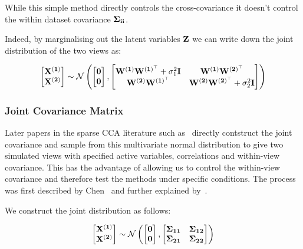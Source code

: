 While this simple method directly controls the cross-covariance it doesn't control the within dataset covariance $\bold{\Sigma_{ii}}$.

Indeed, by marginalising out the latent variables $\bold{Z}$ we can write down the joint distribution of the two views as:

\begin{align}
    \begin{bmatrix} \bold{X^{(1)}} \\ \bold{X^{(2)}} \end{bmatrix} \sim \mathcal{N} \left( \begin{bmatrix} \bold{0} \\ \bold{0} \end{bmatrix}, \begin{bmatrix} \bold{W^{(1)}W^{(1)^{\top}}} + \sigma_1^2\bold{I} & \bold{W^{(1)}W^{(2)^{\top}}} \\ \bold{W^{(2)}W^{(1)^{\top}}} & \bold{W^{(2)}W^{(2)^{\top}}} + \sigma_2^2\bold{I} \end{bmatrix} \right)
\end{align}

\subsubsection{Joint Covariance Matrix}
Later papers in the sparse CCA literature such as~\cite{mai2019iterative,chen2013sparse} directly contstruct the joint covariance and sample from this multivariate normal distribution to give two simulated views with specified active variables, correlations and within-view covariance.
This has the advantage of allowing us to control the within-view covariance and therefore test the methods under specific conditions.
The process was first described by Chen~\cite{chen2013sparse} and further explained by~\cite{suo2017sparse}.

We construct the joint distribution as follows:

\begin{align}\label{eq:covariance}
    \begin{bmatrix} \bold{X^{(1)}} \\ \bold{X^{(2)}} \end{bmatrix} \sim \mathcal{N} \left( \begin{bmatrix} \bold{0} \\ \bold{0} \end{bmatrix}, \begin{bmatrix} \bold{\Sigma_{11}} & \bold{\Sigma_{12}} \\ \bold{\Sigma_{21}} & \bold{\Sigma_{22}} \end{bmatrix} \right)
\end{align}

